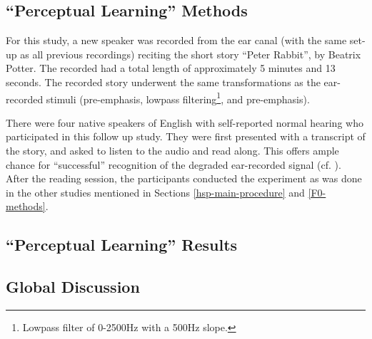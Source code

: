 \documentclass[dissertation,copyright]{uathesis}
\begin{document}
\subsection{``Perceptual Learning'' Methods}

For this study, a new speaker was recorded from the ear canal (with the same set-up as all previous recordings) reciting the short story ``Peter Rabbit'', by Beatrix Potter.  The recorded had a total length of approximately 5 minutes and 13 seconds.  The recorded story underwent the same transformations as the ear-recorded stimuli (pre-emphasis, lowpass filtering\footnote{Lowpass filter of 0-2500Hz with a 500Hz slope.}, and pre-emphasis).

There were four native speakers of English with self-reported normal hearing who participated in this follow up study.  They were first presented with a transcript of the story, and asked to listen to the audio and read along.  This offers ample chance for ``successful'' recognition of the degraded ear-recorded signal (cf. \cite{davis:05}).  After the reading session, the participants conducted the experiment as was done in the other studies mentioned in Sections \ref{hsp-main-procedure} and \ref{F0-methods}.

\subsection{``Perceptual Learning'' Results}



\subsection{Global Discussion}







\end{document}
